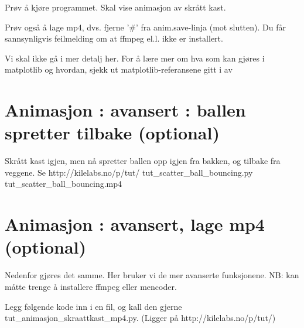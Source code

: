 Prøv å kjøre programmet. Skal vise animasjon av skrått kast. 

Prøv også å lage mp4, dvs. fjerne '\#' fra anim.save-linja (mot slutten). Du får sannsynligvis feilmelding om at ffmpeg el.l. ikke er installert. 

Vi skal ikke gå i mer detalj her. For å lære mer om hva som kan gjøres i matplotlib og hvordan, sjekk ut matplotlib-referansene gitt i av \cite{section:matplotlib}

\section{Animasjon : avansert : ballen spretter tilbake  (optional)}

Skrått kast igjen, men nå spretter ballen opp igjen fra bakken, og tilbake fra veggene. Se http://kilelabs.no/p/tut/
tut\_{}scatter\_{}ball\_{}bouncing.py
tut\_{}scatter\_{}ball\_{}bouncing.mp4

\section{Animasjon : avansert, lage mp4 (optional)}

Nedenfor gjøres det samme. Her bruker vi de mer avanserte funksjonene. NB: kan måtte trenge å installere ffmpeg eller mencoder. 

Legg følgende kode inn i en fil, og kall den gjerne tut\_{}animasjon\_{}skraattkast\_{}mp4.py. (Ligger på http://kilelabs.no/p/tut/)

